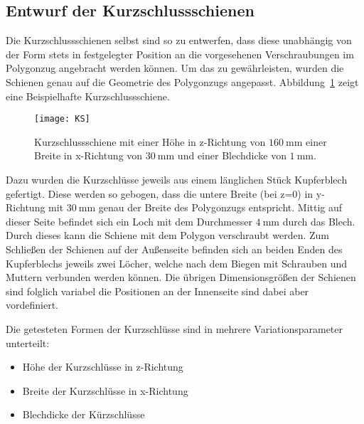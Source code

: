 \newpage



\subsection{Entwurf der Kurzschlussschienen}
\label{sec:shorts}
Die Kurzschlussschienen selbst sind so zu entwerfen, dass diese unabh\"angig von der Form stets in festgelegter Position an die vorgesehenen Verschraubungen im Polygonzug angebracht werden k\"onnen. Um das zu gew\"ahrleisten, wurden die Schienen genau auf die Geometrie des Polygonzugs angepasst. Abbildung~\ref{fig:TZKS} zeigt eine Beispielhafte Kurzschlussschiene.
\par
\begin{figure}[htb]
	\centering
	\texttt{[image: KS]}
	\caption{Kurzschlussschiene mit einer H\"ohe in z-Richtung von $\SI{160}{\milli\meter}$ einer Breite in x-Richtung von $\SI{30}{\milli\meter}$ und einer Blechdicke von $\SI{1}{\milli\meter}$.}
	\label{fig:TZKS}
\end{figure}

Dazu wurden die Kurzschl\"usse jeweils aus einem l\"anglichen St\"uck Kupferblech gefertigt. Diese werden so gebogen, dass die untere Breite (bei z=0) in y-Richtung mit $\SI{30}{\milli\meter}$ genau der Breite des Polygonzugs entspricht. Mittig auf dieser Seite befindet sich ein Loch mit dem Durchmesser $\SI{4}{\milli\meter}$ durch das Blech. Durch dieses kann die Schiene mit dem Polygon verschraubt werden. Zum Schlie\ss{}en der Schienen auf der Au\ss{}enseite befinden sich an beiden Enden des Kupferblechs jeweils zwei L\"ocher, welche nach dem Biegen mit Schrauben und Muttern verbunden werden k\"onnen. Die \"ubrigen Dimensionsgr\"o\ss{}en der Schienen sind folglich variabel die Positionen an der Innenseite sind dabei aber vordefiniert.
\par
Die getesteten Formen der Kurzschl\"usse sind in mehrere Variationsparameter unterteilt:
\begin{itemize}
	\item H\"ohe der Kurzschl\"usse in z-Richtung
	\item Breite der Kurzschl\"usse in x-Richtung
	\item Blechdicke der K\"urzschl\"usse
\end{itemize}



\newpage



